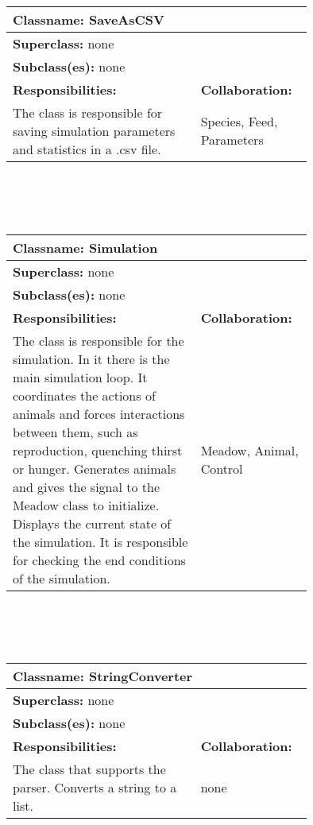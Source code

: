 \documentclass{article}
\begin{document}
\\ \\ \\
\begin{tabular}{|p{0.55\linewidth}|p{0.2\linewidth}|}
\hline
\multicolumn{2}{|l|}{\textbf{Classname:} SaveAsCSV} \\
\hline
\multicolumn{2}{|l|}{\textbf{Superclass:} none} \\
\multicolumn{2}{|l|}{\textbf{Subclass(es):} none} \\
\hline
\textbf{Responsibilities:}  &  \textbf{Collaboration:} \\
The class is responsible for saving simulation parameters and statistics in a .csv file. & Species, Feed, Parameters\\
\hline
\end{tabular}
\\ \\ \\
\begin{tabular}{|p{0.55\linewidth}|p{0.2\linewidth}|}
\hline
\multicolumn{2}{|l|}{\textbf{Classname:} Simulation} \\
\hline
\multicolumn{2}{|l|}{\textbf{Superclass:} none} \\
\multicolumn{2}{|l|}{\textbf{Subclass(es):} none} \\
\hline
\textbf{Responsibilities:}  &  \textbf{Collaboration:} \\
The class is responsible for the simulation. In it there is the main simulation loop. It coordinates the actions of animals and forces interactions between them, such as reproduction, quenching thirst or hunger. Generates animals and gives the signal to the Meadow class to initialize. Displays the current state of the simulation. It is responsible for checking the end conditions of the simulation. & Meadow, Animal, Control \\
\hline
\end{tabular}
\\ \\ \\
\begin{tabular}{|p{0.55\linewidth}|p{0.2\linewidth}|}
\hline
\multicolumn{2}{|l|}{\textbf{Classname:} StringConverter} \\
\hline
\multicolumn{2}{|l|}{\textbf{Superclass:} none} \\
\multicolumn{2}{|l|}{\textbf{Subclass(es):} none} \\
\hline
\textbf{Responsibilities:}  &  \textbf{Collaboration:} \\
The class that supports the parser. Converts a string to a list. & none \\
\hline
\end{tabular}
\end{document}
